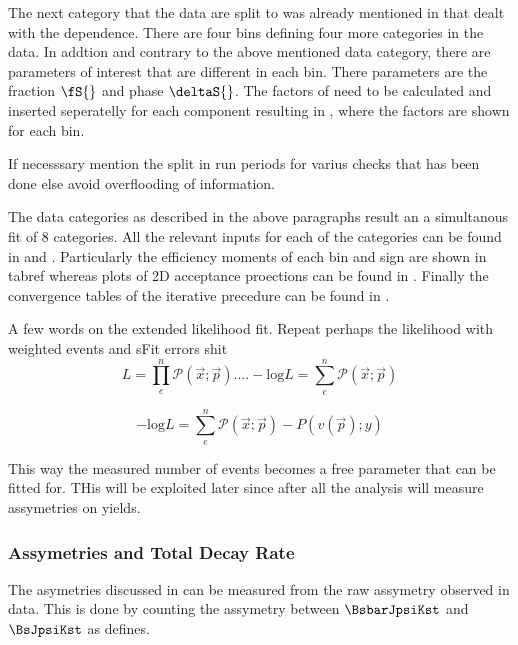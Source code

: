 The next category that the data are split to was already mentioned in \secref{} that dealt with the \mkpi dependence. There are
four \mkpi bins defining four more categories in the data. In addtion and contrary to the above mentioned data category, there 
are parameters of interest that are different in each \mkpi bin. There parameters are the \swave fraction $\fS{}$ and phase $\deltaS{}$.
The \CSP factors of  need to be calculated and inserted seperatelly for each component \pdf resulting in
\tabref{}, where the \CSP factors are shown for each \mkpi bin.

{ \color{red} If necesssary mention the split in run periods for varius checks that has been done else avoid overflooding of information.}

The data categories as described in the above paragraphs result an a simultanous fit of 8 categories. 
All the relevant inputs for each of the categories can be found in \appref{} and \appref{}. Particularly the efficiency moments 
of each \mkpi bin and \kaon sign are shown in tabref{} whereas plots of 2D acceptance proections can be found in \figref{}.
Finally the convergence tables of the iterative precedure can be found in \tabref{}.

A few words on the extended likelihood fit.
Repeat perhaps the likelihood with weighted events and sFit errors shit\\

\begin{equation}
L = \prod_e^n \mathcal{P}(\vec{x};\vec{p}) .... -\text{log}{L} = \sum_e^n \mathcal{P}(\vec{x};\vec{p})
\label{likelihood}
\end{equation}

\begin{equation}
-\text{log}{L} = \sum_e^n \mathcal{P}(\vec{x};\vec{p}) - P(v(\vec{p});y)
\label{extlikelihood}
\end{equation}

This way the measured number of events becomes a free parameter that can be fitted for. THis will be exploited later since after all the analysis
will measure assymetries on yields.
 
\subsubsection{\CP Assymetries and Total Decay Rate}
The \CP asymetries discussed in  can be measured from the raw assymetry observed in data.
This is done by counting the assymetry between $\BsbarJpsiKst$ and $\BsJpsiKst$ as  defines.

